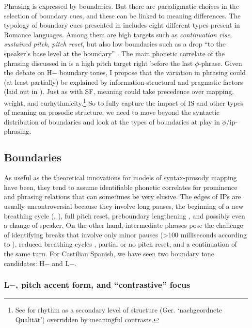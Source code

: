 Phrasing is expressed by 
boundaries. But there are paradigmatic choices in the selection of 
boundary cues, and these can be linked to meaning differences. The typology of boundary cues presented in \citet{FrotaETAL.2007} includes 
eight different types present in Romance languages. Among them are high 
targets such as \textit{continuation rise}, \textit{sustained pitch}, \textit{pitch reset}, but also low boundaries such as 
a drop ``to the speaker's base level at the boundary'' \citep[134]{FrotaETAL.2007}.
The main phonetic correlate of the phrasing discussed in \citet{Prieto.2006} is a high pitch 
target right before the last $\phi$-phrase. Given the debate on H$-$ boundary tones, I propose that the variation in phrasing could (at least partially) be explained by information-structural and pragmatic factors (laid out in ). Just as with \textsc{SF}, meaning could take precedence over mapping, weight, and eurhythmicity.\footnote{See \citet{Dufter2003} for rhythm as a secondary level of structure (Ger. `nachgeordnete Qualität') overridden by meaningful contrasts.} So to fully capture the impact of \ac{IS} and other types of meaning on prosodic structure, we need to move beyond the syntactic distribution of boundaries and look at the types of boundaries at play in $\phi$/\ac{ip}-phrasing. 


\subsection{Boundaries}
\label{ch:2.2.2}

As useful as the theoretical innovations for models of syntax-prosody 
mapping have been, they tend to assume identifiable phonetic correlates 
for prominence and phrasing relations that can sometimes be very elusive. 
The edges of \acp{IP} are usually uncontroversial because they involve 
long pauses, the beginning of a new breathing cycle 
(\cite{Lieberman.1986}, \cite[198--204]{LiebermanBlumstein.1988}), full 
pitch reset, preboundary lengthening 
\citep[438]{PrietoVanSantenHirschberg1995}, and 
possibly even a change of speaker. On the other hand, intermediate phrases pose 
the challenge of identifying breaks that involve only minor 
pauses (>100 
milliseconds according to \cite[138]{Peskova.2015}), reduced breathing cycles \citep{ShiETAL.2010}, 
partial or no pitch reset, and a continuation of the same turn. For 
Castilian Spanish, we have seen two boundary tone candidates: H$-$ and L$-$.

\subsubsection{L$-$, pitch accent form, and ``contrastive'' focus}

